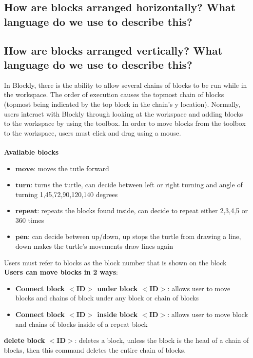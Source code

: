 \documentclass[]{article}
\begin{document}
\subsection{How are blocks arranged horizontally? What language do we use to describe this?}

\subsection{How are blocks arranged vertically? What language do we use to describe this?}

In Blockly, there is the ability to allow several chains of blocks to be run while
in the workspace. The order of execution causes the topmost chain of blocks (topmost 
being indicated by the top block in the chain's y location). Normally, users interact
with Blockly through looking at the workspace and adding blocks to the workspace by
using the toolbox. In order to move blocks from the toolbox to the workspace, users
must click and drag using a mouse. 
\\\\ \textbf{Available blocks}
\begin{itemize}
\item $\textbf{move}$: moves the tutle forward
\item $\textbf{turn}$: turns the turtle, can decide between left or right turning and angle of turning  1,45,72,90,120,140 degrees
\item $\textbf{repeat}$: repeats the blocks found inside, can decide to repeat either 2,3,4,5 or 360 times
\item $\textbf{pen}$: can decide between up/down, up stops the turtle from drawing a line, down makes the turtle's movements draw lines again
\end{itemize}
Users must refer to blocks as the block number that is shown on the block\\
\textbf{Users can move blocks in 2 ways}:
\begin{itemize}
\item \textbf{Connect block $<$ID$>$ under block $<$ID$>$}: allows user to move blocks and chains of block under any block or chain of blocks
\item \textbf{Connect block $<$ID$>$ inside block $<$ID$>$}: allows user to move block and chains of blocks inside of a repeat block
\end{itemize}
\textbf{delete block $<$ID$>$}: deletes a block,  unless the block is the head of a chain of blocks, then this command deletes the entire chain of blocks. 
\end{document}

